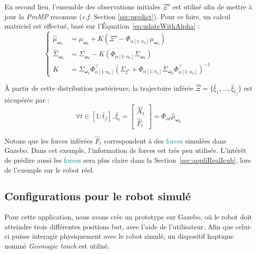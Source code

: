\documentclass[utf8]{frontiersSCNS} %
\newcommand{\comment}[1]{}
\newcommand{\toimprove}[1]{\textcolor{teal}{#1}}
\begin{document}
En second lieu, l'ensemble des observations initiales $\Xi^o$ est utilisé afin de mettre à jour la \textit{ProMP} reconnue (\textit{c.f.} Section \ref{sec:predict}). Pour ce faire, un calcul matriciel est effectué, basé sur l'Équation~\ref{eq:udateWithAlpha} :
$$\left\{
\begin{array}{rl}
\hat{\mu}_{\boldsymbol{\omega}_k} &= \mu_{\boldsymbol{\omega}_k}  + K(\Xi^o - \Phi_{\alpha[1:n_o]} \mu_{\boldsymbol{\omega}_k} ) \\ 
\hat{\Sigma}_{\boldsymbol{\omega}_k}  &= \Sigma_{\boldsymbol{\omega}_k}  - K(\Phi_{\alpha[1:n_o]}\Sigma_{\boldsymbol{\omega}_k} ) \\
K&= \Sigma_{\boldsymbol{\omega}_k} \Phi_{\alpha[1:n_o]}^\top(\Sigma_{\xi^o} + \Phi_{\alpha[1:n_o]}\Sigma_{\boldsymbol{\omega}_k}  \Phi_{\alpha[1:n_o]}^\top)^{-1}
\end{array}
\right.$$

À partir de cette distribution postérieure, la trajectoire inférée $\hat{\Xi} = \{ \hat{\xi}_1,..., \hat{\xi}_{\hat{t}_f}\}$ est récupérée par :
$$ \forall t \in [1:\hat{t}_f],\hat{\xi}_t = \begin{bmatrix} \hat{X}_t \\ \hat{F}_t\end{bmatrix} =  \Phi_{\alpha t} \hat{\mu}_{\boldsymbol{\omega}_k} $$

Notons que les forces inférées $\hat{F}_t$ correspondent à des \toimprove{forces} \comment{wrench} simulées dans Gazebo. Dans cet exemple, l'information ds forces est très peu utilisée. L'intérêt de prédire aussi les \toimprove{forces} \comment{wrenches} sera plus claire dans la Section~\ref{sec:appliRealIcub}, lors de l'exemple sur le robot réel.


\subsection{Configurations pour le robot simulé}
\label{subec:Setup}
Pour cette application, nous avons crée un prototype sur Gazebo, où le robot doit atteindre trois différentes positions but, avec l'aide de l'utilisateur. Afin que celui-ci puisse interagir physiquement avec le robot simulé, un dispositif haptique nommé \textit{Geomagic touch} est utilisé.
\end{document}
